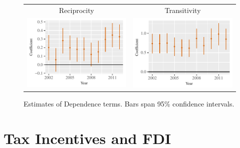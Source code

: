 \documentclass[reqno,onecolumn,letterpaper,12pt]{article}
\begin{document}
{\begin{figure}[!h]
\centering
\begin{tabular}{c@{\hskip 0cm}c}
Reciprocity & Transitivity \\
\includegraphics[height=.2\textheight, clip=true, trim=0cm 0cm 0cm .2cm]{draft_figures/rl_amelia_q25/Mutuality.pdf}    &
\includegraphics[height=.2\textheight, clip=true, trim=0cm 0cm 0cm .2cm]{draft_figures/rl_amelia_q25/Transitivity.pdf}
\end{tabular}
\caption{\label{fig:q25_amelia_netterms} Estimates of Dependence terms. Bars span 95\% confidence intervals. }
\end{figure}


\section{Tax Incentives and FDI}\label{taxresults}

}
\end{document}

